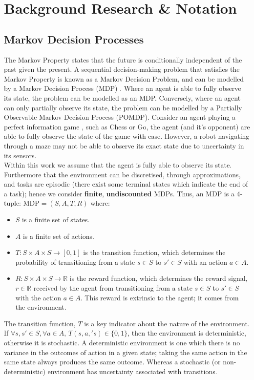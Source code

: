 \chapter{Background Research \& Notation}
\label{chapter2}
\section{Markov Decision Processes}
The Markov Property states that the future is conditionally independent of the past given the present. A sequential decision-making problem that satisfies the Markov Property is known as a Markov Decision Problem, and can be modelled by a Markov Decision Process (MDP) \cite{10.5555/528623}. Where an agent is able to fully observe its state, the problem can be modelled as an MDP. Conversely, where an agent can only partially observe its state, the problem can be modelled by a Partially Observable Markov Decision Process (POMDP).
Consider an agent playing a perfect information game \cite{vonneumann.morgenstern47}, such as Chess or Go, the agent (and it's opponent) are able to fully observe the state of the game with ease. However, a robot navigating through a maze may not be able to observe its exact state due to uncertainty in its sensors.
\\Within this work we assume that the agent is fully able to observe its state. Furthermore that the environment can be discretised, through approximations, and tasks are episodic (there exist some terminal states which indicate the end of a task); hence we consider \textbf{finite}, \textbf{undiscounted} MDPs.
Thus, an MDP is a 4-tuple: $\text{MDP} = (S,A,T,R)$ where:
\begin{itemize}
    \item $S$ is a finite set of states.
    \item $A$ is a finite set of actions.
    \item $T : S \times A \times S \rightarrow [0,1]$ is the transition function, which determines the probability of transitioning from a state $s \in S$ to $s' \in S$ with an action $a \in A$.
    \item $R:S \times A \times S \rightarrow \mathbb{R}$ is the reward function, which determines the reward signal, $r \in \mathbb{R}$ received by the agent from transitioning from a state $s \in S$ to $s' \in S$ with the action $a \in A$. This reward is extrinsic to the agent; it comes from the environment.
\end{itemize}
The transition function, $T$ is a key indicator about the nature of the environment.
If $\forall s,s' \in S, \forall a \in A$, $T(s,a,'s) \in \{0,1\}$, then the environment is deterministic, otherwise it is stochastic.
A deterministic environment is one which there is no variance in the outcomes of action in a given state; taking the same action in the same state always produces the same outcome. Whereas a stochastic (or non-deterministic) environment has uncertainty associated with transitions.
